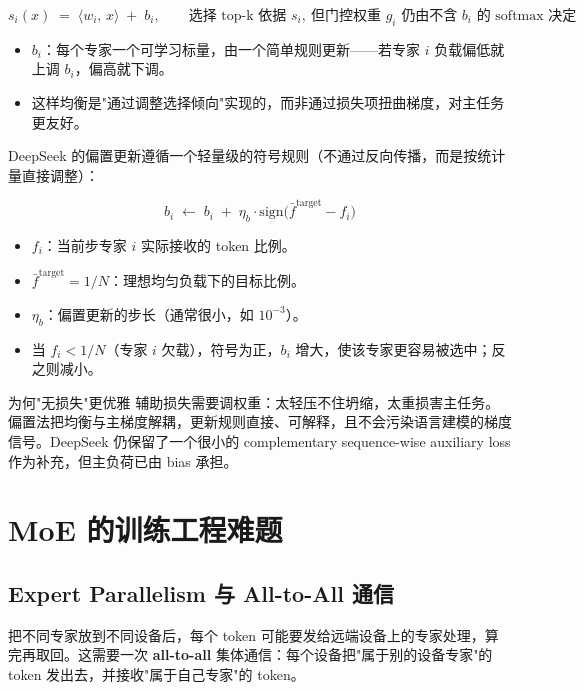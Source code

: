 \documentclass[a4paper]{article}
\begin{document}
\[
s_i(x) \;=\; \langle w_i,\, x\rangle \;+\; b_i, \qquad \text{选择 top-k 依据 } s_i,\ \text{但门控权重 } g_i \text{ 仍由不含 } b_i \text{ 的 softmax 决定}
\]

\begin{itemize}
\item $b_i$：每个专家一个可学习标量，由一个简单规则更新——若专家 $i$ 负载偏低就上调 $b_i$，偏高就下调。
\item 这样均衡是"通过调整选择倾向"实现的，而非通过损失项扭曲梯度，对主任务更友好。
\end{itemize}

DeepSeek 的偏置更新遵循一个轻量级的符号规则（不通过反向传播，而是按统计量直接调整）：

\[
b_i \;\leftarrow\; b_i \;+\; \eta_{b}\cdot\mathrm{sign}\!\bigl(\bar{f}^{\text{target}} - f_i\bigr)
\]

\begin{itemize}
\item $f_i$：当前步专家 $i$ 实际接收的 token 比例。
\item $\bar{f}^{\text{target}}=1/N$：理想均匀负载下的目标比例。
\item $\eta_b$：偏置更新的步长（通常很小，如 $10^{-3}$）。
\item 当 $f_i < 1/N$（专家 $i$ 欠载），符号为正，$b_i$ 增大，使该专家更容易被选中；反之则减小。
\end{itemize}

\begin{knowledgebox}{为何"无损失"更优雅}
辅助损失需要调权重：太轻压不住坍缩，太重损害主任务。偏置法把均衡与主梯度解耦，更新规则直接、可解释，且不会污染语言建模的梯度信号。DeepSeek 仍保留了一个很小的 complementary sequence-wise auxiliary loss 作为补充，但主负荷已由 bias 承担。
\end{knowledgebox}

\section{MoE 的训练工程难题}

\subsection{Expert Parallelism 与 All-to-All 通信}

把不同专家放到不同设备后，每个 token 可能要发给远端设备上的专家处理，算完再取回。这需要一次 \textbf{all-to-all} 集体通信：每个设备把"属于别的设备专家"的 token 发出去，并接收"属于自己专家"的 token。
\end{document}
